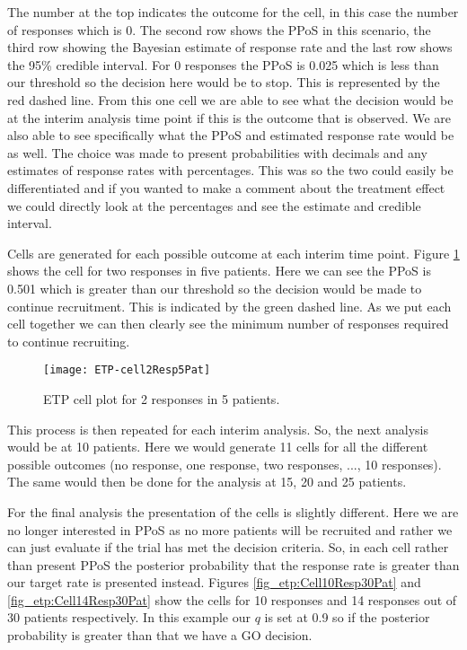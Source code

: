 The number at the top indicates the outcome for the cell, in this case the number of responses which is 0. The second row shows the PPoS in this scenario, the third row showing the Bayesian estimate of response rate and the last row shows the 95\% credible interval. For 0 responses the PPoS is 0.025 which is less than our threshold so the decision here would be to stop. This is represented by the red dashed line. From this one cell we are able to see what the decision would be at the interim analysis time point if this is the outcome that is observed. We are also able to see specifically what the PPoS and estimated response rate would be as well. The choice was made to present probabilities with decimals and any estimates of response rates with percentages. This was so the two could easily be differentiated and if you wanted to make a comment about the treatment effect we could directly look at the percentages and see the estimate and credible interval.   

Cells are generated for each possible outcome at each interim time point. Figure \ref{fig_etp:Cell2Resp5Pat} shows the cell for two responses in five patients. Here we can see the PPoS is 0.501 which is greater than our threshold so the decision would be made to continue recruitment. This is indicated by the green dashed line. As we put each cell together we can then clearly see the minimum number of responses required to continue recruiting.  

\begin{figure}[h!]
	\centering
	\caption{ETP cell plot for 2 responses in 5 patients.}
	\label{fig_etp:Cell2Resp5Pat}
	\texttt{[image: ETP-cell2Resp5Pat]}
\end{figure}

This process is then repeated for each interim analysis. So, the next analysis would be at 10 patients. Here we would generate 11 cells for all the different possible outcomes (no response, one response, two responses, ..., 10 responses). The same would then be done for the analysis at 15, 20 and 25 patients. 

For the final analysis the presentation of the cells is slightly different. Here we are no longer interested in PPoS as no more patients will be recruited and rather we can just evaluate if the trial has met the decision criteria. So, in each cell rather than present PPoS the posterior probability that the response rate is greater than our target rate is presented instead. Figures \ref{fig_etp:Cell10Resp30Pat} and \ref{fig_etp:Cell14Resp30Pat} show the cells for 10 responses and 14 responses out of 30 patients respectively. In this example our $q$ is set at 0.9 so if the posterior probability is greater than that we have a GO decision. 


